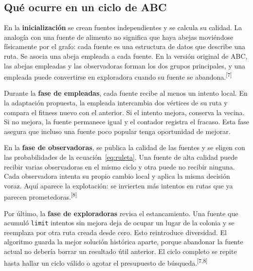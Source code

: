 \documentclass[11pt,letterpaper]{article}
\newcommand{\src}[1]{\textsuperscript{\textcolor{cian}{[#1]}}}
\begin{document}
\subsection{Qué ocurre en un ciclo de ABC}
En la \textbf{inicialización} se crean fuentes independientes y se calcula su calidad. La analogía con una fuente de alimento no significa que haya abejas moviéndose físicamente por el grafo: cada fuente es una estructura de datos que describe una ruta. Se asocia una abeja empleada a cada fuente. En la versión original de ABC, las abejas empleadas y las observadoras forman los dos grupos principales, y una empleada puede convertirse en exploradora cuando su fuente se abandona.\src{7}

Durante la \textbf{fase de empleadas}, cada fuente recibe al menos un intento local. En la adaptación propuesta, la empleada intercambia dos vértices de su ruta y compara el fitness nuevo con el anterior. Si el intento mejora, conserva la vecina. Si no mejora, la fuente permanece igual y el contador registra el fracaso. Esta fase asegura que incluso una fuente poco popular tenga oportunidad de mejorar.

En la \textbf{fase de observadoras}, se publica la calidad de las fuentes y se eligen con las probabilidades de la ecuación~\eqref{eq:ruleta}. Una fuente de alta calidad puede recibir varias observadoras en el mismo ciclo y otra puede no recibir ninguna. Cada observadora intenta su propio cambio local y aplica la misma decisión voraz. Aquí aparece la explotación: se invierten más intentos en rutas que ya parecen prometedoras.\src{8}

Por último, la \textbf{fase de exploradoras} revisa el estancamiento. Una fuente que acumuló \texttt{limit} intentos sin mejora deja de ocupar un lugar de la colonia y se reemplaza por otra ruta creada desde cero. Esto reintroduce diversidad. El algoritmo guarda la mejor solución histórica aparte, porque abandonar la fuente actual no debería borrar un resultado útil anterior. El ciclo completo se repite hasta hallar un ciclo válido o agotar el presupuesto de búsqueda.\src{7,8}
\end{document}
